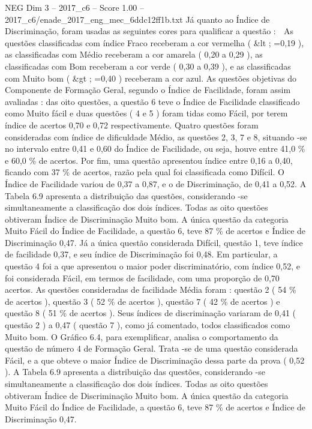 \begin{textsample}{NEG Dim 3 – 2017\_c6 – Score 1.00 – 2017\_c6/enade\_2017\_eng\_mec\_6ddc12ff1b.txt}
Já quanto ao Índice de Discriminação, foram usadas as seguintes cores para qualificar a questão :  As questões classificadas com índice Fraco receberam a cor vermelha ( \&lt ; =0,19 ), as classificadas com Médio receberam a cor amarela ( 0,20 a 0,29 ), as classificadas com Bom receberam a cor verde ( 0,30 a 0,39 ), e as classificadas com Muito bom ( \&gt ; =0,40 ) receberam a cor azul.
As questões objetivas do Componente de Formação Geral, segundo o Índice de Facilidade, foram assim avaliadas : das oito questões, a questão 6 teve o Índice de Facilidade classificado como Muito fácil e duas questões ( 4 e 5 ) foram tidas como Fácil, por terem índice de acertos 0,70 e 0,72 respectivamente.
Quatro questões foram consideradas com índice de dificuldade Médio, as questões 2, 3, 7 e 8, situando -se no intervalo entre 0,41 e 0,60 do Índice de Facilidade, ou seja, houve entre 41,0 \% e 60,0 \% de acertos.
Por fim, uma questão apresentou índice entre 0,16 a 0,40, ficando com 37 \% de acertos, razão pela qual foi classificada como Difícil.
O Índice de Facilidade variou de 0,37 a 0,87, e o de Discriminação, de 0,41 a 0,52.
A Tabela 6.9 apresenta a distribuição das questões, considerando -se simultaneamente a classificação dos dois índices.
Todas as oito questões obtiveram Índice de Discriminação Muito bom.
A única questão da categoria Muito Fácil do Índice de Facilidade, a questão 6, teve 87 \% de acertos e Índice de Discriminação 0,47.
Já a única questão considerada Difícil, questão 1, teve índice de facilidade 0,37, e seu índice de Discriminação foi 0,48.
Em particular, a questão 4 foi a que apresentou o maior poder discriminatório, com índice 0,52, e foi considerada Fácil, em termos de facilidade, com uma proporção de 0,70 acertos.
As questões consideradas de facilidade Média foram : questão 2 ( 54 \% de acertos ), questão 3 ( 52 \% de acertos ), questão 7 ( 42 \% de acertos ) e questão 8 ( 51 \% de acertos ).
Seus índices de discriminação variaram de 0,41 ( questão 2 ) a 0,47 ( questão 7 ), como já comentado, todos classificados como Muito bom.
O Gráfico 6.4, para exemplificar, analisa o comportamento da questão de número 4 de Formação Geral.
Trata -se de uma questão considerada Fácil, e a que obteve o maior Índice de Discriminação dessa parte da prova ( 0,52 ).
A Tabela 6.9 apresenta a distribuição das questões, considerando -se simultaneamente a classificação dos dois índices.
Todas as oito questões obtiveram Índice de Discriminação Muito bom.
A única questão da categoria Muito Fácil do Índice de Facilidade, a questão 6, teve 87 \% de acertos e Índice de Discriminação 0,47.

\end{textsample}

